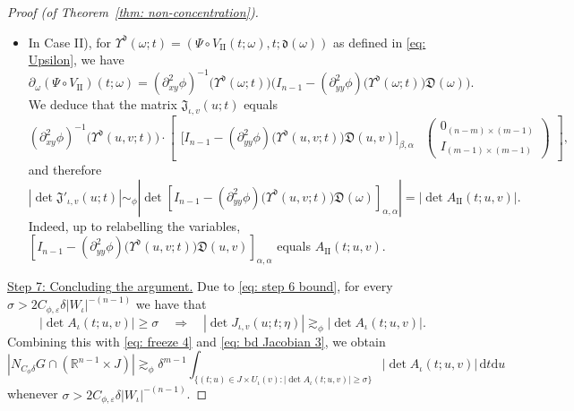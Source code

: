 \documentclass[reqno]{amsart}
\numberwithin{equation}{section}
\newcommand{\R}{\mathbb{R}}
\newcommand{\ud}{\mathrm{d}}
\newcommand{\fd}{\mathfrak{d}}
\newcommand{\fD}{\mathfrak{D}}
\newcommand{\fJ}{\mathfrak{J}}
\theoremstyle{plain}
\theoremstyle{definition}
\newcommand{\tII}{\mathrm{II}}
\begin{document}
\begin{proof}[Proof (of Theorem~\ref{thm: non-concentration})]
\begin{itemize}
\item In Case II), for $\Upsilon^{\fd}(\omega; t) = (\Psi\circ V_{\tII}(t;\omega), t; \fd(\omega))$ as defined in \eqref{eq: Upsilon}, we have
    \begin{equation*}
\partial_{\omega} (\Psi \circ V_{\tII})(t;\omega) =(\partial_{xy}^2\phi)^{-1}\big(\Upsilon^{\fd}(\omega; t)\big)\Big(I_{n-1} - (\partial_{yy}^2\phi)\big(\Upsilon^{\fd}(\omega; t)\big)\fD(\omega)\Big).
\end{equation*}
We deduce that the matrix $\fJ_{\iota,v}(u;t)$ equals
\begin{equation*}
    (\partial_{xy}^2\phi)^{-1}\big(\Upsilon^{\fd}(u,v; t)\big)\cdot
    \begin{bmatrix}
      \big[ I_{n-1} - (\partial_{yy}^2\phi)\big(\Upsilon^{\fd}(u,v; t)\big)\fD(u,v)\big]_{\beta, \alpha} &  
         \begin{pmatrix}
 0_{(n-m)\times(m-1)}\\
 I_{(m-1)\times (m-1)}
 \end{pmatrix}
    \end{bmatrix},
\end{equation*}
and therefore
\begin{equation*}
    |\det \fJ'_{\iota,v}(u;t)|\sim_\phi |\det [I_{n-1} - (\partial_{yy}^2\phi)\big(\Upsilon^{\fd}(u,v; t)\big)\fD(\omega)]_{\alpha,\alpha}|=|\det A_{\tII}(t;u,v)|.
\end{equation*}
Indeed, up to relabelling the variables, $[I_{n-1} - (\partial_{yy}^2\phi)\big(\Upsilon^{\fd}(u,v; t)\big)\fD(u,v)]_{\alpha,\alpha}$ equals $A_{\tII}(t;u,v)$.
\end{itemize}
\medskip




\noindent \underline{Step 7: Concluding the argument.} Due to \eqref{eq: step 6 bound}, for every $\sigma>2C_{\phi, \varepsilon} \delta |W_\iota|^{-(n-1)}$ we have that
\begin{equation*}
    |\det A_\iota (t;u,v)|\geq \sigma \quad \Longrightarrow \quad |\det J_{\iota,v}(u;t;\eta)|\gtrsim_\phi  |\det A_\iota (t;u,v)|.
\end{equation*}
Combining this with \eqref{eq: freeze 4} and \eqref{eq: bd Jacobian 3}, we obtain
\begin{equation*}
    |N_{C_\phi\delta} G \cap (\R^{n-1} \times J)| \gtrsim_\phi \delta^{m-1} \int_{\{(t; u) \in J \times U_{\iota}(v) : |\det A_{\iota}(t; u,v)| \geq \sigma\}}|\det A_{\iota}(t; u,v)|\,\ud t\ud u
\end{equation*}
whenever $\sigma > 2C_{\phi, \varepsilon} \delta |W_\iota|^{-(n-1)}$. 


\end{proof}
\end{document}
